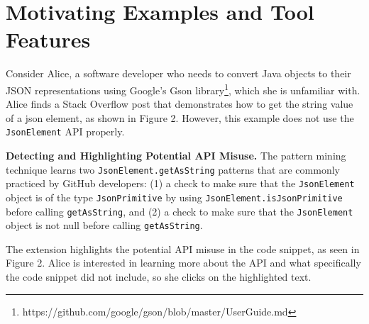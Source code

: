 \section{Motivating Examples and Tool Features}
\label{sec:motivation}
Consider Alice, a software developer who needs to convert Java objects to their JSON representations using Google's Gson library\footnote{https://github.com/google/gson/blob/master/UserGuide.md}, which she is unfamiliar with. Alice finds a Stack Overflow post that demonstrates how to get the string value of a json element, as shown in Figure 2. However, this example does not use the {\tt JsonElement} API properly. 

{\bf Detecting and Highlighting Potential API Misuse.}
The pattern mining technique learns two {\tt JsonElement.getAsString} patterns that are commonly practiced by GitHub developers: (1) a check to make sure that the {\tt JsonElement} object is of the type {\tt JsonPrimitive} by using {\tt JsonElement.isJsonPrimitive} before calling {\tt getAsString}, and (2) a check to make sure that the {\tt JsonElement} object is not null before calling {\tt getAsString}.

The extension highlights the potential API misuse in the code snippet, as seen in Figure 2. Alice is interested in learning more about the API and what specifically the code snippet did not include, so she clicks on the highlighted text.

